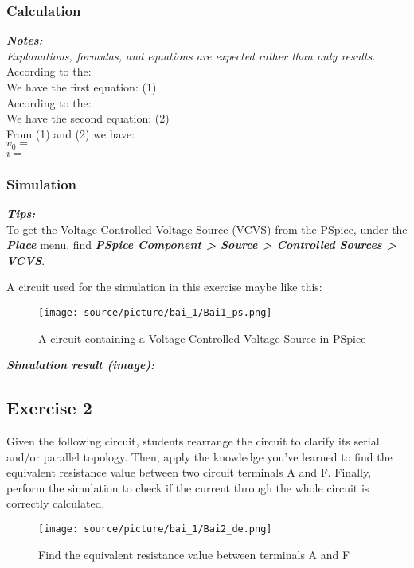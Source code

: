 \subsubsection{Calculation}
\textit{\textbf{Notes:}}\\
\textit{Explanations, formulas, and equations are expected rather than only results.}\\

According to the: \dotfill\bigskip\\
We have the first equation: \dotfill\bigskip(1)\\
According to the: \dotfill\bigskip\\
We have the second equation: \dotfill\bigskip(2)\\
From (1) and (2) we have:\bigskip\\
$v_0 = $ \dotfill\bigskip\\
$i = $ \dotfill\bigskip\\

\subsubsection{Simulation}

\textbf{\textit{Tips:}}\\
To get the Voltage Controlled Voltage Source (VCVS) from the PSpice, under the \textit{\textbf{Place}} menu, find \textbf{\textit{PSpice Component > Source > Controlled Sources > VCVS}}.

A circuit used for the simulation in this exercise maybe like this:
\begin{figure}[H]
    \centering
    \texttt{[image: source/picture/bai\_1/Bai1\_ps.png]}
    \caption{A circuit containing a Voltage Controlled Voltage Source in PSpice}
    \label{ab1_ex1_ps}
\end{figure}

\textit{\textbf{Simulation result (image):}}
\newpage

\subsection{Exercise 2}
Given the following circuit, students rearrange the circuit to clarify its serial and/or parallel topology. Then, apply the knowledge you've learned to find the equivalent resistance value between two circuit terminals A and F. Finally, perform the simulation to check if the current through the whole circuit is correctly calculated.

\begin{figure}[H]
    \centering
    \texttt{[image: source/picture/bai\_1/Bai2\_de.png]}
    \caption{Find the equivalent resistance value between terminals A and F}
    \label{lab1_ex2_de}
\end{figure}

